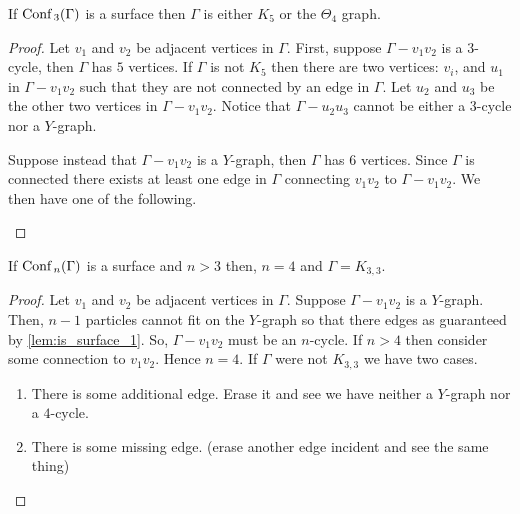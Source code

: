 \begin{thm}
    If \(\text{Conf}\,_3(\Gamma)\) is a surface then \(\Gamma\) is either \(K_5\) or the \(\Theta_4\) graph.
\end{thm}
\begin{proof}
    Let \(v_1\) and \(v_2\) be adjacent vertices in \(\Gamma\).
    First, suppose \(\Gamma - v_1 v_2\) is a \(3\)-cycle, then \(\Gamma\) has \(5\) vertices.
    If \(\Gamma\) is not \(K_5\) then there are two vertices: \(v_i\), and \(u_1\) in \(\Gamma - v_1 v_2\)
    such that they are not connected by an edge in \(\Gamma\).
    Let \(u_2\) and \(u_3\) be the other two vertices in \(\Gamma - v_1 v_2\).
    Notice that \(\Gamma - u_2 u_3\) cannot be either a \(3\)-cycle nor a \(Y\)-graph.

    Suppose instead that \(\Gamma - v_1 v_2\) is a \(Y\)-graph, then \(\Gamma\) has \(6\) vertices.
    Since \(\Gamma\) is connected there exists at least one edge in \(\Gamma\) connecting \(v_1 v_2\) to \(\Gamma - v_1 v_2\).
    We then have one of the following.
    \begin{figure}
    \end{figure}
\end{proof}

\begin{thm}
    If \(\text{Conf}\,_n(\Gamma)\) is a surface and \(n > 3\) then, \(n = 4\) and \(\Gamma = K_{3,3}\).
\end{thm}
\begin{proof}
    Let \(v_1\) and \(v_2\) be adjacent vertices in \(\Gamma\).
    Suppose \(\Gamma - v_1 v_2\) is a \(Y\)-graph.
    Then, \(n-1\) particles cannot fit on the \(Y\)-graph so that there edges as guaranteed by \ref{lem:is_surface_1}.
    So, \(\Gamma - v_1 v_2\) must be an \(n\)-cycle.
    If \(n > 4\) then consider some connection to \(v_1 v_2\).
    Hence \(n = 4\).
    If \(\Gamma\) were not \(K_{3,3}\) we have two cases.
    \begin{enumerate}
        \item There is some additional edge. Erase it and see we have neither a \(Y\)-graph nor a \(4\)-cycle.
        \item There is some missing edge. (erase another edge incident and see the same thing)
    \end{enumerate}

\end{proof}
